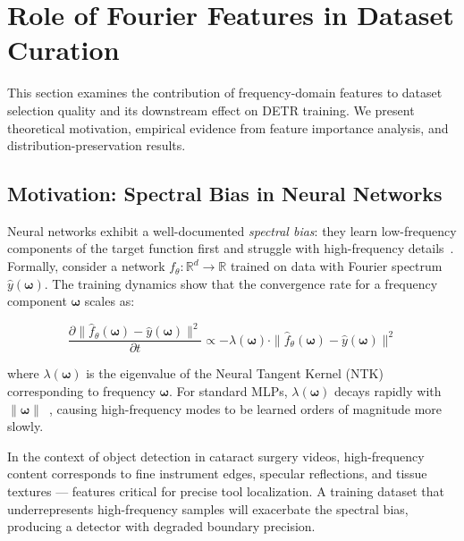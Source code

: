 
\section{Role of Fourier Features in Dataset Curation}
\label{sec:fourier_impact}

This section examines the contribution of frequency-domain features to dataset
selection quality and its downstream effect on DETR training.  We present
theoretical motivation, empirical evidence from feature importance analysis,
and distribution-preservation results.


\subsection{Motivation: Spectral Bias in Neural Networks}
\label{sec:spectral_bias}

Neural networks exhibit a well-documented \emph{spectral bias}: they learn
low-frequency components of the target function first and struggle with
high-frequency details~\cite{rahaman2019spectral, tancik2020fourier}.
Formally, consider a network $f_\theta: \mathbb{R}^d \to \mathbb{R}$ trained
on data with Fourier spectrum $\hat{y}(\boldsymbol{\omega})$.  The training
dynamics show that the convergence rate for a frequency component
$\boldsymbol{\omega}$ scales as:

\begin{equation}
    \frac{\partial \|\hat{f}_\theta(\boldsymbol{\omega}) - \hat{y}(\boldsymbol{\omega})\|^2}
         {\partial t}
    \propto -\lambda(\boldsymbol{\omega})
    \cdot \|\hat{f}_\theta(\boldsymbol{\omega}) - \hat{y}(\boldsymbol{\omega})\|^2
\end{equation}

where $\lambda(\boldsymbol{\omega})$ is the eigenvalue of the Neural Tangent
Kernel (NTK) corresponding to frequency $\boldsymbol{\omega}$.  For standard
MLPs, $\lambda(\boldsymbol{\omega})$ decays rapidly with
$\|\boldsymbol{\omega}\|$~\cite{tancik2020fourier}, causing high-frequency
modes to be learned orders of magnitude more slowly.

In the context of object detection in cataract surgery videos, high-frequency
content corresponds to fine instrument edges, specular reflections, and tissue
textures --- features critical for precise tool localization.  A training
dataset that underrepresents high-frequency samples will exacerbate the
spectral bias, producing a detector with degraded boundary precision.

